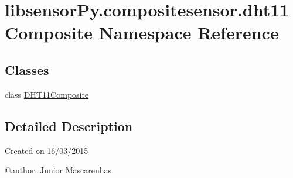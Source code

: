 \hypertarget{namespacelibsensorPy_1_1compositesensor_1_1dht11Composite}{}\section{libsensor\+Py.\+compositesensor.\+dht11\+Composite Namespace Reference}
\label{namespacelibsensorPy_1_1compositesensor_1_1dht11Composite}
\subsection*{Classes}
\begin{DoxyCompactItemize}
\item 
class \hyperlink{classlibsensorPy_1_1compositesensor_1_1dht11Composite_1_1DHT11Composite}{D\+H\+T11\+Composite}
\end{DoxyCompactItemize}


\subsection{Detailed Description}
\begin{DoxyVerb}Created on 16/03/2015

@author: Junior Mascarenhas
\end{DoxyVerb}
 